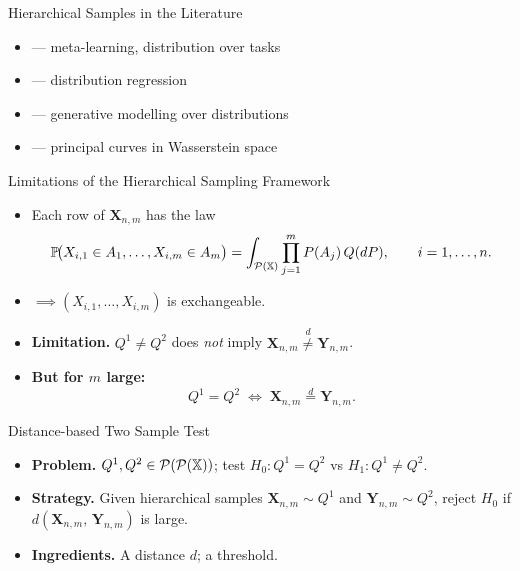 \documentclass[aspectratio=169, 10pt]{beamer}
\begin{document}

\begin{frame}{Hierarchical Samples in the Literature}
  \begin{itemize}
    \setlength\itemsep{0.9em}
    \item \textcite{Baxter2000} — meta-learning, distribution over tasks
    \item \textcite{Szabo2016} — distribution regression 
    \item \textcite{Haviv2024} — generative modelling over distributions
    \item \textcite{Warren2025} — principal curves in Wasserstein space
  \end{itemize}
\end{frame}




\begin{frame}{Limitations of the Hierarchical Sampling Framework}
  \begin{itemize}
    \setlength\itemsep{1.0em}
    \item Each row of $\mathbf{X}_{n,m}$ has the law
      \[
        \mathbb{P}\!\big(X_{i,1}\in A_1,\ldots,X_{i,m}\in A_m\big)
        = \int_{\mathcal{P}(\mathbb{X})} \prod_{j=1}^{m} P(A_j)\, Q(dP),
        \qquad i=1,\ldots,n.
      \]
    \pause
    \item $\implies (X_{i,1},\ldots,X_{i,m})$ is exchangeable.
    \pause
    \item \textbf{Limitation.} $Q^1 \neq Q^2$ does \emph{not} imply
      $\mathbf{X}_{n,m} \overset{d}{\neq} \mathbf{Y}_{n,m}$.
    \pause
    \item \textbf{But for $m$ large:}
      \[
        Q^1 = Q^2
        \;\iff\;
        \mathbf{X}_{n,m} \overset{d}{=} \mathbf{Y}_{n,m}.
      \]
  \end{itemize}
\end{frame}


\begin{frame}{Distance-based Two Sample Test}
  \begin{itemize}
    \setlength\itemsep{1.2em}
    \item \textbf{Problem.} $Q^1, Q^2 \in \mathcal{P}(\mathcal{P}(\mathbb{X}))$;\quad
          test $H_0 : Q^1 = Q^2$ vs $H_1 : Q^1 \neq Q^2$.
    \pause
    \item \textbf{Strategy.} Given hierarchical samples $\mathbf{X}_{n,m} \sim Q^1$
          and $\mathbf{Y}_{n,m} \sim Q^2$, reject $H_0$ if
          $d(\mathbf{X}_{n,m},\, \mathbf{Y}_{n,m})$ is large.
    \pause
    \item \textbf{Ingredients.} A distance $d$; a threshold.
  \end{itemize}
\end{frame}
\end{document}
